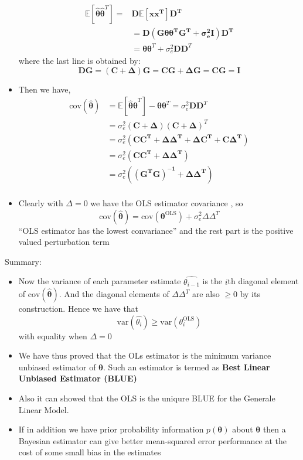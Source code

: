 \documentclass[12pt]{article}
\newcommand{\empha}[1]{\textbf{\textcolor{blue1}{#1}}}
\newcommand{\sigd}{\sigma^2}
\newcommand{\var}{\textrm{var}}
\newcommand{\mexp}{\mathbb{E}}
\newcommand{\OLS}{\textrm{OLS}}
\newcommand{\thetab}{\boldsymbol{\theta}}
\newcommand{\thetaols}{\thetab^\OLS}
\newcommand{\cov}{\textrm{cov}}
\newcommand{\prethe}{\hat{\thetab}}
\begin{document}
\begin{itemize}
\begin{align*}
        \mexp[\prethe\prethe^T] =& \mathbf{D \mexp[xx^T]D^T} \\
        & = \mathbf{D(G\thetab\thetab^T G^T + \sigd_e I)D^T }\\
        & = \thetab\thetab^T + \sigd_e \mathbf{DD}^T
    \end{align*}
    where the last line is obtained by:
    \[
    \mathbf{DG = (C + \Delta)G = CG + \Delta G = CG = I}
    \]
    \item Then we have,
    \begin{align*}
        \cov(\prethe) & = \mexp[\prethe\prethe^T] - \thetab\thetab^T = \sigd_e \mathbf{DD}^T \\
        & = \sigd_e \mathbf{(C+\Delta)(C+\Delta)}^T \\
        & = \sigd_e \mathbf{(CC^T + \Delta\Delta^T + \Delta C^T + C\Delta^T)} \\
        & = \sigd_e \mathbf{(CC^T + \Delta\Delta^T)} \\
        & = \sigd_e \mathbf{((G^T G)^{-1} + \Delta\Delta^T)} \\
    \end{align*}
    \item Clearly with $\Delta = 0$ we have the OLS estimator covariance , so 
    \[
    \cov(\prethe) = \cov(\thetaols) + \sigd_e \Delta \Delta^T
    \]
    ``OLS estimator has the lowest convariance'' and the rest part is the positive valued perturbation term
    
\end{itemize}
Summary:
\begin{itemize}
    \item Now the variance of each parameter estimate $\hat{\theta_{i-1}}$ is the $i$th diagonal element of $\cov(\prethe)$. And the diagonal elements of $\Delta\Delta^T$ are also $\ge 0 $ by its construction. Hence we have that 
    \[
    \var(\hat{\theta_i}) \ge \var(\theta_{i}^{\OLS})
    \]
    with equality when $\Delta = 0$
    \item We have thus proved that the OLs estimator is the minimum variance unbiased estimator of $\thetab$. Such an estimator is termed as \empha{Best Linear Unbiased Estimator (BLUE)}
    \item Also it can showed that the OLS is the uniqure BLUE for the Generale Linear Model.
    \item If in addition we have prior probability information $p(\thetab)$ about $\thetab$ then a Bayesian estimator can give better mean-squared error performance at the cost of some small bias in the estimates 
\end{itemize}
\end{document}
